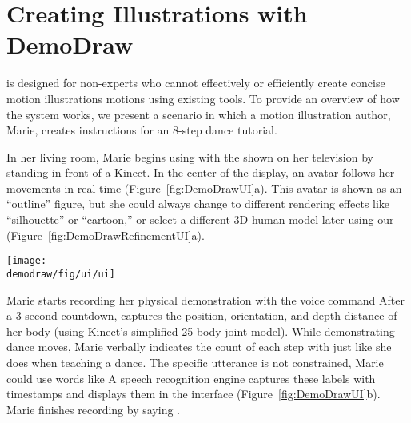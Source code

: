 
\section{Creating Illustrations with DemoDraw}

\systemname{} is designed for non-experts who cannot effectively or efficiently create concise motion illustrations motions using existing tools.
To provide an overview of how the system works, we present a scenario in which a motion illustration author, Marie, creates instructions for an 8-step dance tutorial.

In her living room, Marie begins using \systemname{} with the \phaseI{} shown on her television by standing in front of a Kinect. In the center of the display, an avatar follows her movements in real-time (Figure~\ref{fig:DemoDrawUI}a).
This avatar is shown as an ``outline'' figure, but she could always change to different rendering effects like ``silhouette'' or ``cartoon,'' or select a different 3D human model later using our \phaseII{} (Figure~\ref{fig:DemoDrawRefinementUI}a).

\begin{figure*}[!t]
  \centering
  \texttt{[image: \\demodraw/fig/ui/ui]}
  \caption{\systemname{} authoring UI: Using the \phaseI{}, an author sees an avatar following her real-time movement (a). During recording (initiated by voice command ``Start''), real-time feedback shows the speech labels (b). Once a recording is completed by voice command ``Stop'', the motion visualization and a timeline are immediately available (c) for the author to review, and a step-by-step overview will be generated.}
  \label{fig:DemoDrawUI}
\end{figure*}

Marie starts recording her physical demonstration with the voice command  After a 3-second countdown, \systemname{} captures the position, orientation, and depth distance of her body (using Kinect's simplified 25 body joint model).
%
While demonstrating dance moves, Marie verbally indicates the count of each step with  just like she does when teaching a dance. The specific utterance is not constrained, Marie could use words like  A speech recognition engine captures these labels with timestamps and displays them in the interface (Figure~\ref{fig:DemoDrawUI}b).
Marie finishes recording by saying .

